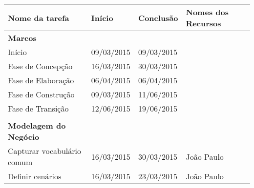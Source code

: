 \begin{table}[h]
\begin{tabular}{llll}
\hline
\textbf{Nome da tarefa}                 & \textbf{Início} & \textbf{Conclusão} & \textbf{Nomes dos Recursos}                                                                             \\ \hline
\textbf{Marcos}                         &                 &                    &                                                                                                         \\
Início                                  & 09/03/2015      & 09/03/2015         &                                                                                                         \\
Fase de Concepção                       & 16/03/2015      & 30/03/2015         &                                                                                                         \\
Fase de Elaboração                      & 06/04/2015      & 06/04/2015         &                                                                                                         \\
Fase de Construção                      & 09/03/2015      & 11/06/2015         &                                                                                                         \\
Fase de Transição                       & 12/06/2015      & 19/06/2015         &                                                                                                         \\
                                        &                 &                    &                                                                                                         \\
\textbf{Modelagem do Negócio}           &                 &                    &                                                                                                         \\
Capturar vocabulário comum              & 16/03/2015      & 30/03/2015         & João Paulo                                                                                              \\
Definir cenários                        & 16/03/2015      & 23/03/2015         & João Paulo                                                                                              \\

\end{tabular}
\end{table}
